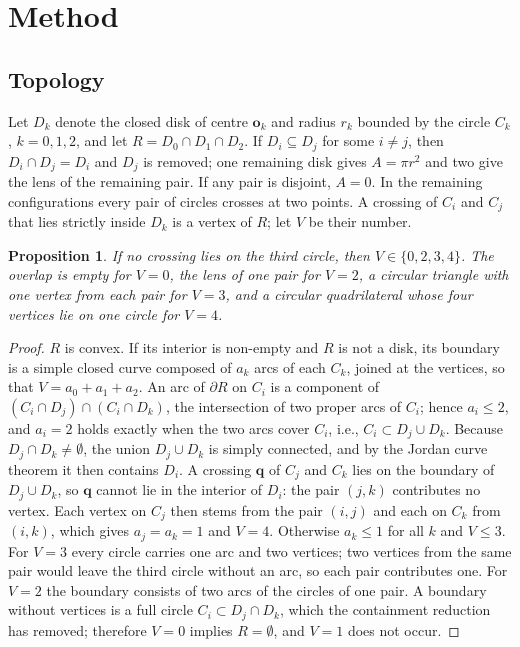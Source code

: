 \documentclass[twocolumn]{aastex701}
\newtheorem{proposition}{Proposition}
\begin{document}
\section{Method} \label{sec:method}

\subsection{Topology} \label{sec:topology}

Let $D_k$ denote the closed disk of centre $\mathbf{o}_k$ and radius $r_k$
bounded by the circle $C_k$, $k=0,1,2$, and let $R=D_0\cap D_1\cap D_2$.
If $D_i\subseteq D_j$ for some $i\neq j$, then $D_i\cap D_j=D_i$ and $D_j$
is removed; one remaining disk gives $A=\pi r^2$ and two give the lens of
the remaining pair. If any pair is disjoint, $A=0$. In the remaining
configurations every pair of circles crosses at two points. A crossing of
$C_i$ and $C_j$ that lies strictly inside $D_k$ is a vertex of $R$; let
$V$ be their number.

\begin{proposition}
If no crossing lies on the third circle, then $V\in\{0,2,3,4\}$. The
overlap is empty for $V=0$, the lens of one pair for $V=2$, a circular
triangle with one vertex from each pair for $V=3$, and a circular
quadrilateral whose four vertices lie on one circle for $V=4$.
\end{proposition}

\begin{proof}
$R$ is convex. If its interior is non-empty and $R$ is not a disk, its
boundary is a simple closed curve composed of $a_k$ arcs of each $C_k$,
joined at the vertices, so that $V=a_0+a_1+a_2$. An arc of $\partial R$ on
$C_i$ is a component of $(C_i\cap D_j)\cap(C_i\cap D_k)$, the intersection
of two proper arcs of $C_i$; hence $a_i\le2$, and $a_i=2$ holds exactly
when the two arcs cover $C_i$, i.e., $C_i\subset D_j\cup D_k$. Because
$D_j\cap D_k\neq\emptyset$, the union $D_j\cup D_k$ is simply connected,
and by the Jordan curve theorem it then contains $D_i$. A crossing
$\mathbf{q}$ of $C_j$ and $C_k$ lies on the boundary of $D_j\cup D_k$, so
$\mathbf{q}$ cannot lie in the interior of $D_i$: the pair $(j,k)$
contributes no vertex. Each vertex on $C_j$ then stems from the pair
$(i,j)$ and each on $C_k$ from $(i,k)$, which gives $a_j=a_k=1$ and $V=4$.
Otherwise $a_k\le1$ for all $k$ and $V\le3$. For $V=3$ every circle
carries one arc and two vertices; two vertices from the same pair would
leave the third circle without an arc, so each pair contributes one. For
$V=2$ the boundary consists of two arcs of the circles of one pair. A
boundary without vertices is a full circle $C_i\subset D_j\cap D_k$,
which the containment reduction has removed; therefore $V=0$ implies
$R=\emptyset$, and $V=1$ does not occur.
\end{proof}
\end{document}
